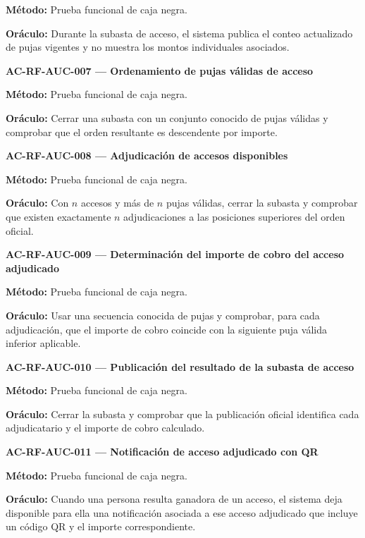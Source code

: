 \documentclass[10pt,letterpaper]{article}
\begin{document}
\textbf{Método:} Prueba funcional de caja negra.\par
\textbf{Oráculo:} Durante la subasta de acceso, el sistema publica el conteo actualizado de pujas vigentes y no muestra los montos individuales asociados.\par\vspace{0.45em}
\noindent\textbf{AC-RF-AUC-007 --- Ordenamiento de pujas válidas de acceso}\par
\textbf{Método:} Prueba funcional de caja negra.\par
\textbf{Oráculo:} Cerrar una subasta con un conjunto conocido de pujas válidas y comprobar que el orden resultante es descendente por importe.\par\vspace{0.45em}
\noindent\textbf{AC-RF-AUC-008 --- Adjudicación de accesos disponibles}\par
\textbf{Método:} Prueba funcional de caja negra.\par
\textbf{Oráculo:} Con $n$ accesos y más de $n$ pujas válidas, cerrar la subasta y comprobar que existen exactamente $n$ adjudicaciones a las posiciones superiores del orden oficial.\par\vspace{0.45em}
\noindent\textbf{AC-RF-AUC-009 --- Determinación del importe de cobro del acceso adjudicado}\par
\textbf{Método:} Prueba funcional de caja negra.\par
\textbf{Oráculo:} Usar una secuencia conocida de pujas y comprobar, para cada adjudicación, que el importe de cobro coincide con la siguiente puja válida inferior aplicable.\par\vspace{0.45em}
\noindent\textbf{AC-RF-AUC-010 --- Publicación del resultado de la subasta de acceso}\par
\textbf{Método:} Prueba funcional de caja negra.\par
\textbf{Oráculo:} Cerrar la subasta y comprobar que la publicación oficial identifica cada adjudicatario y el importe de cobro calculado.\par\vspace{0.45em}
\noindent\textbf{AC-RF-AUC-011 --- Notificación de acceso adjudicado con QR}\par
\textbf{Método:} Prueba funcional de caja negra.\par
\textbf{Oráculo:} Cuando una persona resulta ganadora de un acceso, el sistema deja disponible para ella una notificación asociada a ese acceso adjudicado que incluye un código QR y el importe correspondiente.\par\vspace{0.45em}
\end{document}

